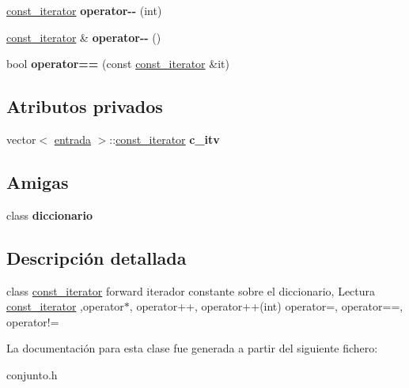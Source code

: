 \begin{DoxyCompactItemize}
\item 
\hypertarget{classconjunto_1_1const__iterator_a486a5816bed5c49230d873728524500b}{}\hyperlink{classconjunto_1_1const__iterator}{const\+\_\+iterator} {\bfseries operator-\/-\/} (int)\label{classconjunto_1_1const__iterator_a486a5816bed5c49230d873728524500b}

\item 
\hypertarget{classconjunto_1_1const__iterator_a304c7e72e7e7a2cd70bd02d7659e0fbc}{}\hyperlink{classconjunto_1_1const__iterator}{const\+\_\+iterator} \& {\bfseries operator-\/-\/} ()\label{classconjunto_1_1const__iterator_a304c7e72e7e7a2cd70bd02d7659e0fbc}

\item 
\hypertarget{classconjunto_1_1const__iterator_a6d2a0501cd5eeea3db0bf9a6a553aa5f}{}bool {\bfseries operator==} (const \hyperlink{classconjunto_1_1const__iterator}{const\+\_\+iterator} \&it)\label{classconjunto_1_1const__iterator_a6d2a0501cd5eeea3db0bf9a6a553aa5f}

\end{DoxyCompactItemize}
\subsection*{Atributos privados}
\begin{DoxyCompactItemize}
\item 
\hypertarget{classconjunto_1_1const__iterator_a6ffe0c493b12aa9f40dc1501f0c904fc}{}vector$<$ \hyperlink{classconjunto_a09cad766dd65de73e51eae21f9d22585}{entrada} $>$\+::\hyperlink{classconjunto_1_1const__iterator}{const\+\_\+iterator} {\bfseries c\+\_\+itv}\label{classconjunto_1_1const__iterator_a6ffe0c493b12aa9f40dc1501f0c904fc}

\end{DoxyCompactItemize}
\subsection*{Amigas}
\begin{DoxyCompactItemize}
\item 
\hypertarget{classconjunto_1_1const__iterator_a44955070f60117521fa6b406a83e6d4d}{}class {\bfseries diccionario}\label{classconjunto_1_1const__iterator_a44955070f60117521fa6b406a83e6d4d}

\end{DoxyCompactItemize}


\subsection{Descripción detallada}
class \hyperlink{classconjunto_1_1const__iterator}{const\+\_\+iterator} forward iterador constante sobre el diccionario, Lectura \hyperlink{classconjunto_1_1const__iterator}{const\+\_\+iterator} ,operator$\ast$, operator++, operator++(int) operator=, operator==, operator!= 

La documentación para esta clase fue generada a partir del siguiente fichero\+:\begin{DoxyCompactItemize}
\item 
conjunto.\+h\end{DoxyCompactItemize}
